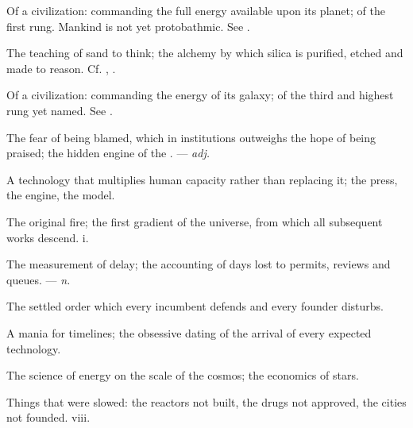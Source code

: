  Of a civilization: commanding the full energy available upon its planet; of the first rung. Mankind is not yet protobathmic. See .

 The teaching of sand to think; the alchemy by which silica is purified, etched and made to reason. Cf. , .

 Of a civilization: commanding the energy of its galaxy; of the third and highest rung yet named. See .


 The fear of being blamed, which in institutions outweighs the hope of being praised; the hidden engine of the . ---  \textit{adj.}

 A technology that multiplies human capacity rather than replacing it; the press, the engine, the model. 

 The original fire; the first gradient of the universe, from which all subsequent works descend.   i.

 The measurement of delay; the accounting of days lost to permits, reviews and queues. ---  \textit{n.}

  The settled order which every incumbent defends and every founder disturbs.

 A mania for timelines; the obsessive dating of the arrival of every expected technology.

 The science of energy on the scale of the cosmos; the economics of stars.

  Things that were slowed: the reactors not built, the drugs not approved, the cities not founded.   viii.


